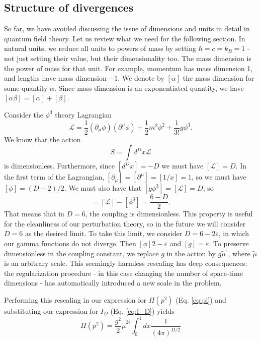 \documentclass{article}
\numberwithin{equation}{section}
\begin{document}
\subsection{Structure of divergences}

So far, we have avoided discussing the issue of dimensions and units in detail in quantum field theory. Let us review what we need for the following section. In natural units, we reduce all units to powers of mass by setting $\hbar = c = k_B = 1$ - not just setting their value, but their dimensionality too. The mass dimension is the power of mass for that unit. For example, momentum has mass dimension 1, and lengths have mass dimension $-1$. We denote by $[\alpha]$ the mass dimension for some quantity $\alpha$. Since mass dimension is an exponentiated quantity, we have $[\alpha\beta] = [\alpha] + [\beta]$. 

Consider the $\phi^3$ theory Lagrangian
\begin{equation}
    \mathcal{L} = \frac{1}{2}(\partial_\mu \phi)(\partial^\mu \phi) + \frac{1}{2}m^2 \phi^2 + \frac{1}{3!}g \phi^3.
\end{equation}
We know that the action
\begin{equation}
    S = \int d^Dx \mathcal{L}
\end{equation}
is dimensionless. Furthermore, since $[d^Dx] = -D$ we must have $[\mathcal{L}] = D$. In the first term of the Lagrangian, $[\partial_\mu] = [\partial^\mu] = [1/x] = 1$, so we must have $[\phi] = (D-2)/2$. We must also have that $[g\phi^3] = [\mathcal{L}] = D$, so
\begin{equation}
    [g] = [\mathcal{L}] - [\phi^3] = \frac{6-D}{2}.
\end{equation}
That means that in $D=6$, the coupling is dimensionless. This property is useful for the cleanliness of our perturbation theory, so in the future we will consider $D=6$ as the desired limit. To take this limit, we consider $D=6-2\varepsilon$, in which our gamma functions do not diverge. Then $[\phi] 2-\varepsilon$ and $[g] = \varepsilon$. To preserve dimensionless in the coupling constant, we replace $g$ in the action by $g\tilde{\mu}^\epsilon$, where $\tilde{\mu}$ is an arbitrary scale. This seemingly harmless rescaling has deep consequences: the regularization procedure - in this case changing the number of space-time dimensions - has automatically introduced a new scale in the problem. 

Performing this rescaling in our expression for $\Pi(p^2)$ (Eq. \ref{eq:pi}) and substituting our expression for $I_D$ (Eq. \ref{eq:I_D}) yields
\begin{equation}
    \Pi(p^2) = \frac{g^2}{2} \tilde{\mu}^{2\epsilon} \int_0^1 dx \frac{1}{(4\pi)^{D/2}}
\end{equation}
\end{document}
